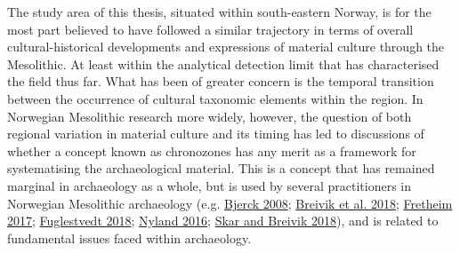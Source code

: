 \documentclass[
  12pt,
  a4paper,
  oneside]{book}
\begin{document}
The study area of this thesis, situated within south-eastern Norway, is for the most part believed to have followed a similar trajectory in terms of overall cultural-historical developments and expressions of material culture through the Mesolithic. At least within the analytical detection limit that has characterised the field thus far. What has been of greater concern is the temporal transition between the occurrence of cultural taxonomic elements within the region. In Norwegian Mesolithic research more widely, however, the question of both regional variation in material culture and its timing has led to discussions of whether a concept known as \textquotesingle chronozones\textquotesingle{} has any merit as a framework for systematising the archaeological material. This is a concept that has remained marginal in archaeology as a whole, but is used by several practitioners in Norwegian Mesolithic archaeology (e.g. \protect\hyperlink{ref-bjerck2008}{Bjerck 2008}; \protect\hyperlink{ref-breivik2018}{Breivik et al. 2018}; \protect\hyperlink{ref-fretheim2017}{Fretheim 2017}; \protect\hyperlink{ref-fuglestvedt2018}{Fuglestvedt 2018}; \protect\hyperlink{ref-nyland2016}{Nyland 2016}; \protect\hyperlink{ref-skar2018}{Skar and Breivik 2018}), and is related to fundamental issues faced within archaeology.
\end{document}
